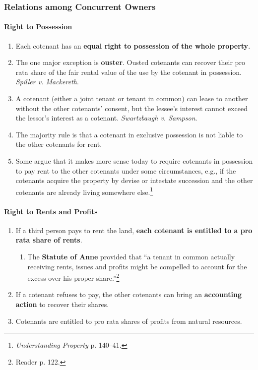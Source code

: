 \subsubsection{Relations among Concurrent Owners}

\paragraph{Right to Possession}

\begin{enumerate}
    \item Each cotenant has an \textbf{equal right to possession of the whole 
    property}.
    \item The one major exception is \textbf{ouster}. Ousted cotenants can 
    recover their pro rata share of the fair rental value of the use by the 
    cotenant in possession. \emph{Spiller v. Mackereth}.
    \item A cotenant (either a joint tenant or tenant in common)  can lease to 
    another without the other cotenants' consent, but the lessee's interest 
    cannot exceed the lessor's interest as a cotenant.  \emph{Swartzbaugh v. 
    Sampson}.
    \item The majority rule is that a cotenant in exclusive possession is not 
    liable to the other cotenants for rent.
    \item Some argue that it makes more sense today to require cotenants in 
    possession to pay rent to the other cotenants under some circumstances, 
    e.g., if the cotenants acquire the property by devise or intestate 
    succession and the other cotenants are already living somewhere 
    else.\footnote{\emph{Understanding Property} p. 140--41.}
\end{enumerate}

\paragraph{Right to Rents and Profits}

\begin{enumerate}
    \item If a third person pays to rent the land, \textbf{each cotenant is 
    entitled to a pro rata share of rents}.
    \begin{enumerate}
        \item The \textbf{Statute of Anne} provided that ``a tenant in common 
        actually receiving rents, issues and profits might be compelled to 
        account for the excess over his proper share.''\footnote{Reader p. 
        122.}
    \end{enumerate}
    \item If a cotenant refuses to pay, the other cotenants can bring an 
    \textbf{accounting action} to recover their shares.
    \item Cotenants are entitled to pro rata shares of profits from natural 
    resources.
\end{enumerate}

